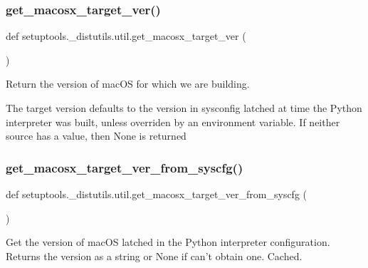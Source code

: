 \subsubsection{\texorpdfstring{get\+\_\+macosx\+\_\+target\+\_\+ver()}{get\_macosx\_target\_ver()}}
{\footnotesize\ttfamily def setuptools.\+\_\+distutils.\+util.\+get\+\_\+macosx\+\_\+target\+\_\+ver (\begin{DoxyParamCaption}{ }\end{DoxyParamCaption})}

\begin{DoxyVerb}Return the version of macOS for which we are building.

The target version defaults to the version in sysconfig latched at time
the Python interpreter was built, unless overriden by an environment
variable. If neither source has a value, then None is returned\end{DoxyVerb}
 \mbox{\label{namespacesetuptools_1_1__distutils_1_1util_adcd427d50fb4eb7922e334f7701cbb18}} 
\subsubsection{\texorpdfstring{get\+\_\+macosx\+\_\+target\+\_\+ver\+\_\+from\+\_\+syscfg()}{get\_macosx\_target\_ver\_from\_syscfg()}}
{\footnotesize\ttfamily def setuptools.\+\_\+distutils.\+util.\+get\+\_\+macosx\+\_\+target\+\_\+ver\+\_\+from\+\_\+syscfg (\begin{DoxyParamCaption}{ }\end{DoxyParamCaption})}

\begin{DoxyVerb}Get the version of macOS latched in the Python interpreter configuration.
Returns the version as a string or None if can't obtain one. Cached.\end{DoxyVerb}
 \mbox{\label{namespacesetuptools_1_1__distutils_1_1util_a2018b70d9c21723b3aa244dc7d44fe43}} 
